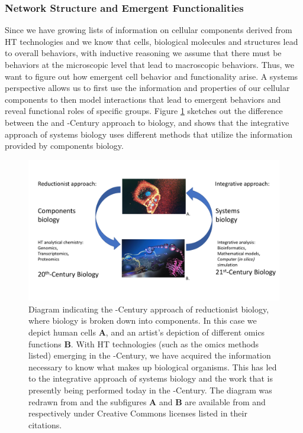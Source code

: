 \subsubsection{Network Structure and Emergent Functionalities} \label{ref:intro-emergent-function}
Since we have growing lists of information on cellular components derived from \acrshort{HT} technologies and we know that cells, biological molecules and structures lead to overall behaviors, with inductive reasoning we assume that there must be behaviors at the microscopic level that lead to macroscopic behaviors. Thus, we want to figure out how emergent cell behavior and functionality arise. A systems perspective allows us to first use the information and properties of our cellular components to then model interactions that lead to emergent behaviors and reveal functional roles of specific groups. Figure \ref{fig-intro-systems} sketches out the difference between the  and -Century approach to biology, and shows that the integrative approach of systems biology uses different methods that utilize the information provided by components biology. 
\begin{figure}[ht!]
    \centering
    \includegraphics[width=1.0\linewidth]{figure/background/systems.pdf}
    \caption[Diagram indicating the -Century approach of reductionist biology, where biology is broken down into components. In this case we depict human cells (\textbf{A}), and an artist's depiction of different omics functions (\textbf{B}).]{Diagram indicating the -Century approach of reductionist biology, where biology is broken down into components. In this case we depict human cells \textbf{A}, and an artist's depiction of different omics functions \textbf{B}. With \acrshort{HT} technologies (such as the omics methods listed) emerging in the -Century, we have acquired the information necessary to know what makes up biological organisms. This has led to the integrative approach of systems biology and the work that is presently being performed today in the -Century. The diagram was redrawn from \citet{Palsson2000,Palsson2006} and the subfigures \textbf{A} and \textbf{B} are available from \citet{Vidal2013} and \citet{Rager2012} respectively under Creative Commons licenses listed in their citations.}
    \label{fig-intro-systems}
\end{figure}

